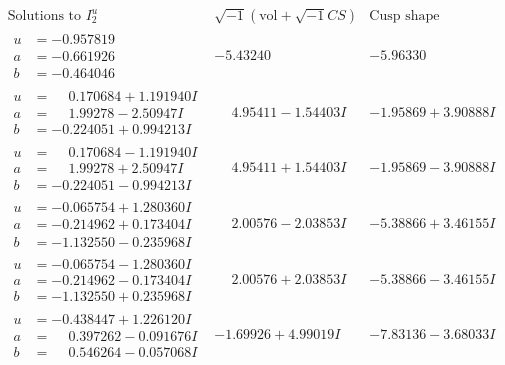 \documentclass[1p]{elsarticle_modified}
\theoremstyle{definition}
\newcommand{\I}{\sqrt{-1}}
\begin{document}
$$\begin{array}{c|c|c}  
\text{Solutions to }I^u_{2}& \I (\text{vol} + \sqrt{-1}CS) & \text{Cusp shape}\\
 \hline 
\begin{aligned}
u &= -0.957819\phantom{ +0.000000I} \\
a &= -0.661926\phantom{ +0.000000I} \\
b &= -0.464046\phantom{ +0.000000I}\end{aligned}
 & -5.43240\phantom{ +0.000000I} & -5.96330\phantom{ +0.000000I} \\ \hline\begin{aligned}
u &= \phantom{-}0.170684 + 1.191940 I \\
a &= \phantom{-}1.99278 - 2.50947 I \\
b &= -0.224051 + 0.994213 I\end{aligned}
 & \phantom{-}4.95411 - 1.54403 I & -1.95869 + 3.90888 I \\ \hline\begin{aligned}
u &= \phantom{-}0.170684 - 1.191940 I \\
a &= \phantom{-}1.99278 + 2.50947 I \\
b &= -0.224051 - 0.994213 I\end{aligned}
 & \phantom{-}4.95411 + 1.54403 I & -1.95869 - 3.90888 I \\ \hline\begin{aligned}
u &= -0.065754 + 1.280360 I \\
a &= -0.214962 + 0.173404 I \\
b &= -1.132550 - 0.235968 I\end{aligned}
 & \phantom{-}2.00576 - 2.03853 I & -5.38866 + 3.46155 I \\ \hline\begin{aligned}
u &= -0.065754 - 1.280360 I \\
a &= -0.214962 - 0.173404 I \\
b &= -1.132550 + 0.235968 I\end{aligned}
 & \phantom{-}2.00576 + 2.03853 I & -5.38866 - 3.46155 I \\ \hline\begin{aligned}
u &= -0.438447 + 1.226120 I \\
a &= \phantom{-}0.397262 - 0.091676 I \\
b &= \phantom{-}0.546264 - 0.057068 I\end{aligned}
 & -1.69926 + 4.99019 I & -7.83136 - 3.68033 I \\ \hline\begin{aligned}

\end{aligned}
\end{array}$$
\end{document}
